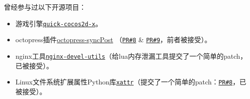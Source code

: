 \documentclass[letterpaper]{article}
\begin{document}
\begin{itemize}
\end{itemize}

曾经参与过以下开源项目：
\begin{itemize}
    \item 游戏引擎\href{https://github.com/dualface/v3quick}{\tt quick-cocos2d-x}。
    \item octopress插件\href{https://github.com/huangbowen521/octopress-syncPost}{octopress-syncPost} （\href{https://github.com/huangbowen521/octopress-syncPost/pull/8}{\tt PR\#8} \& \href{https://github.com/huangbowen521/octopress-syncPost/pull/9}{\tt PR\#9}，前者被接受）。
    \item nginx工具\href{https://github.com/openresty/openresty-devel-utils}{\tt nginx-devel-utils}（给lua内存泄漏工具提交了一个简单的patch，已被接受）。
    \item Linux文件系统扩展属性Python库\href{https://github.com/xattr/xattr}{\tt xattr}（提交了一个简单的patch：\href{https://github.com/xattr/xattr/issues/8}{\tt PR\#8}，已被接受）。
\end{itemize}

\end{document}
